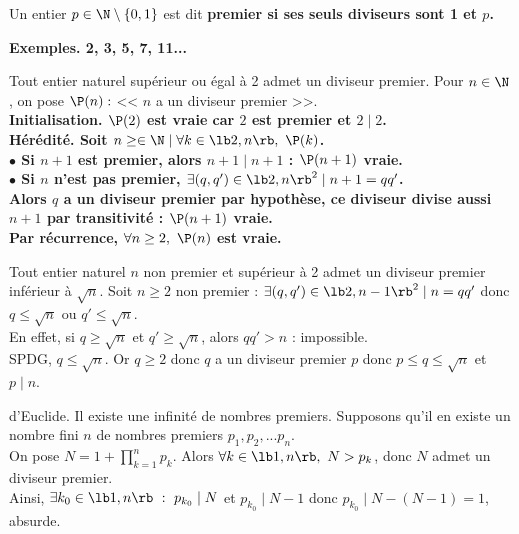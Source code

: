 \documentclass[11pt]{article}
\begin{document}
\begin{defi}{}{}
    Un entier $p\in\N\setminus\{0,1\}$ est dit \bf{premier} si ses seuls diviseurs sont 1 et $p$.
\end{defi}

\bf{Exemples.} 2, 3, 5, 7, 11...

\begin{prop}{}{}
    Tout entier naturel supérieur ou égal à 2 admet un diviseur premier.
    \tcblower
    Pour $n\in\N$, on pose $\P(n):$ << $n$ a un diviseur premier >>.\\
    \bf{Initialisation.} $\P(2)$ est vraie car $2$ est premier et $2\mid2$.\\
    \bf{Hérédité.} Soit $n\geq\in\N \mid \forall k \in \lb2,n\rb, ~ \P(k)$.\\
    $\bullet$ Si $n+1$ est premier, alors $n+1\mid n+1$ : $\P(n+1)$ vraie.\\
    $\bullet$ Si $n$ n'est pas premier, $\exists(q,q')\in\lb2,n\rb^2\mid n+1=qq'$.\\
    Alors $q$ a un diviseur premier par hypothèse, ce diviseur divise aussi $n+1$ par transitivité : $\P(n+1)$ vraie.\\
    Par récurrence, $\forall n\geq2, ~ \P(n)$ est vraie.
\end{prop}

\begin{prop}{}{}
    Tout entier naturel $n$ non premier et supérieur à 2 admet un diviseur premier inférieur à $\sqrt{n}$.
    \tcblower
    Soit $n\geq2$ non premier : $\exists(q,q')\in\lb2,n-1\rb^2\mid n=qq'$ donc $q\leq\sqrt{n}$ ou $q'\leq\sqrt{n}$.\\
    En effet, si $q\geq\sqrt{n}$ et $q'\geq\sqrt{n}$, alors $qq'>n$ : impossible.\\
    SPDG, $q\leq\sqrt{n}$. Or $q\geq2$ donc $q$ a un diviseur premier $p$ donc $p\leq q \leq \sqrt{n}$ et $p\mid n$.
\end{prop}

\begin{thm}{d'Euclide.}{}
    Il existe une infinité de nombres premiers.
    \tcblower
    Supposons qu'il en existe un nombre fini $n$ de nombres premiers $p_1,p_2,...p_n$.\\
    On pose $N=1+\prod_{k=1}^np_k$. Alors $\forall k\in\lb1,n\rb, ~ N>p_k$, donc $N$ admet un diviseur premier.\\
    Ainsi, $\exists k_0 \in \lb1,n\rb ~:~ p_{k_0}\mid N$ et $p_{k_0}\mid N-1$ donc $p_{k_0}\mid N - (N-1)=1$, absurde.
\end{thm}
\end{document}
